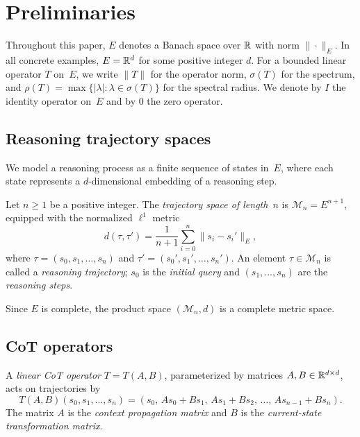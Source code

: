 \section{Preliminaries}\label{sec:prelim}

Throughout this paper, $E$ denotes a Banach space over $\mathbb{R}$ with norm
$\|\cdot\|_E$. In all concrete examples, $E=\mathbb{R}^d$ for some positive integer
$d$. For a bounded linear operator $T$ on~$E$, we write $\|T\|$ for the
operator norm, $\sigma(T)$ for the spectrum, and $\rho(T)=\max\{|\lambda|:
\lambda\in\sigma(T)\}$ for the spectral radius. We denote by $I$ the identity
operator on~$E$ and by $0$ the zero operator.

\subsection{Reasoning trajectory spaces}

We model a reasoning process as a finite sequence of states in~$E$, where each
state represents a $d$-dimensional embedding of a reasoning step.

\begin{definition}\label{def:trajectory}
  Let $n\geq 1$ be a positive integer. The \emph{trajectory space of length~$n$}
  is $\mathcal{M}_n = E^{n+1}$, equipped with the normalized $\ell^1$ metric
  \begin{equation}\label{eq:metric}
    d(\tau,\tau') = \frac{1}{n+1}\sum_{i=0}^{n}\|s_i - s_i'\|_E,
  \end{equation}
  where $\tau=(s_0,s_1,\dots,s_n)$ and $\tau'=(s_0',s_1',\dots,s_n')$.
  An element $\tau\in\mathcal{M}_n$ is called a \emph{reasoning trajectory};
  $s_0$ is the \emph{initial query} and $(s_1,\dots,s_n)$ are the
  \emph{reasoning steps}.
\end{definition}

Since $E$ is complete, the product space $(\mathcal{M}_n,d)$ is a complete
metric space.

\subsection{CoT operators}

\begin{definition}\label{def:cot}
  A \emph{linear CoT operator} $T=T(A,B)$, parameterized by matrices
  $A,B\in\mathbb{R}^{d\times d}$, acts on trajectories by
  \begin{equation}\label{eq:cot-action}
    T(A,B)(s_0,s_1,\dots,s_n) = (s_0,\, As_0+Bs_1,\, As_1+Bs_2,\,
    \dots,\, As_{n-1}+Bs_n).
  \end{equation}
  The matrix $A$ is the \emph{context propagation matrix} and $B$ is the
  \emph{current-state transformation matrix}.
\end{definition}

